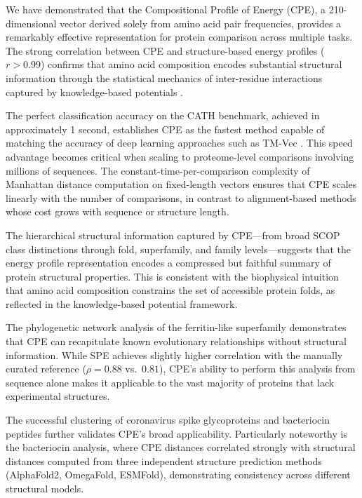 \documentclass[11pt]{article}
\begin{document}
We have demonstrated that the Compositional Profile of Energy (CPE), a 210-dimensional vector derived solely from amino acid pair frequencies, provides a remarkably effective representation for protein comparison across multiple tasks. The strong correlation between CPE and structure-based energy profiles ($r > 0.99$) confirms that amino acid composition encodes substantial structural information through the statistical mechanics of inter-residue interactions captured by knowledge-based potentials \citep{sippl1990}.

The perfect classification accuracy on the CATH benchmark, achieved in approximately 1 second, establishes CPE as the fastest method capable of matching the accuracy of deep learning approaches such as TM-Vec \citep{heinzinger2023}. This speed advantage becomes critical when scaling to proteome-level comparisons involving millions of sequences. The constant-time-per-comparison complexity of Manhattan distance computation on fixed-length vectors ensures that CPE scales linearly with the number of comparisons, in contrast to alignment-based methods whose cost grows with sequence or structure length.

The hierarchical structural information captured by CPE---from broad SCOP class distinctions through fold, superfamily, and family levels---suggests that the energy profile representation encodes a compressed but faithful summary of protein structural properties. This is consistent with the biophysical intuition that amino acid composition constrains the set of accessible protein folds, as reflected in the knowledge-based potential framework.

The phylogenetic network analysis of the ferritin-like superfamily demonstrates that CPE can recapitulate known evolutionary relationships without structural information. While SPE achieves slightly higher correlation with the manually curated reference ($\rho = 0.88$ vs.\ $0.81$), CPE's ability to perform this analysis from sequence alone makes it applicable to the vast majority of proteins that lack experimental structures.

The successful clustering of coronavirus spike glycoproteins and bacteriocin peptides further validates CPE's broad applicability. Particularly noteworthy is the bacteriocin analysis, where CPE distances correlated strongly with structural distances computed from three independent structure prediction methods (AlphaFold2, OmegaFold, ESMFold), demonstrating consistency across different structural models.
\end{document}
